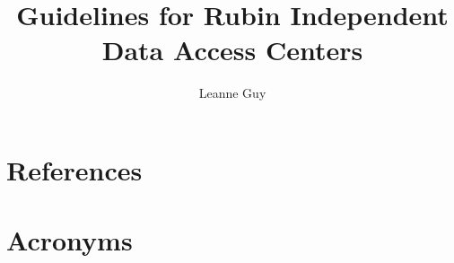 \documentclass[DM,authoryear,toc]{lsstdoc}
\title{Guidelines for Rubin Independent Data Access Centers}
\author{%
Leanne Guy
}
\date{\vcsDate}
\begin{document}
\maketitle


\appendix
\section{References} \label{sec:bib}
\renewcommand{\refname}{} %


\section{Acronyms} \label{sec:acronyms}

\end{document}
